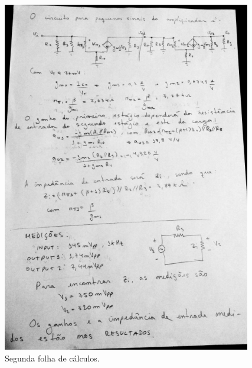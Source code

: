 \begin{figure}[h!] 
\includegraphics[scale=1]{imagens/calc2.png} 
\centering
\caption{Segunda folha de cálculos.}
\label{calc:2} 
\end{figure} 







     






